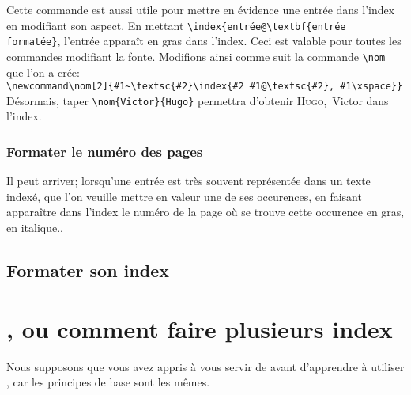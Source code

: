 Cette commande est aussi utile pour mettre en évidence une entrée dans l'index en modifiant son aspect. En mettant \verb+\index{entrée@\textbf{entrée formatée}+, l'entrée apparaît en gras dans l'index. Ceci est valable pour toutes les commandes modifiant la fonte. Modifions ainsi comme suit la commande \verb+\nom+ que l'on a crée:\\
\verb+\newcommand\nom[2]{#1~\textsc{#2}\index{#2 #1@\textsc{#2}, #1\xspace}}+\\
Désormais, taper \verb|\nom{Victor}{Hugo}| permettra d'obtenir \textsc{Hugo},~Victor dans l'index.
 
 
 
\subsubsection{Formater le numéro des pages}

Il peut arriver; lorsqu'une entrée est très souvent représentée dans un texte indexé, que l'on veuille mettre en valeur une de ses occurences, en faisant apparaître dans l'index le numéro de la page où se trouve cette occurence en gras, en italique..

\subsection{Formater son index}







\section{, ou comment faire plusieurs index}

\begin{prealable}
Nous supposons que vous avez appris à vous servir de  avant d'apprendre à utiliser , car les principes de base sont les mêmes.
\end{prealable}


